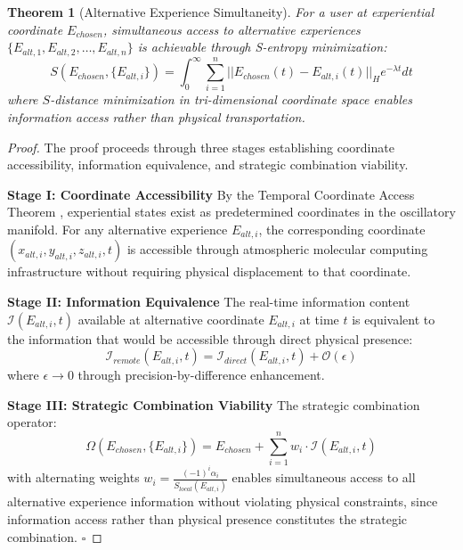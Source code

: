 \documentclass[12pt,a4paper]{article}
\newtheorem{theorem}{Theorem}
\begin{document}
\begin{theorem}[Alternative Experience Simultaneity]
For a user at experiential coordinate $E_{chosen}$, simultaneous access to alternative experiences $\{E_{alt,1}, E_{alt,2}, \ldots, E_{alt,n}\}$ is achievable through S-entropy minimization:
\begin{equation}
S(E_{chosen}, \{E_{alt,i}\}) = \int_0^{\infty} \sum_{i=1}^n ||E_{chosen}(t) - E_{alt,i}(t)||_H e^{-\lambda t} dt
\end{equation}
where $S$-distance minimization in tri-dimensional coordinate space enables information access rather than physical transportation.
\end{theorem}

\begin{proof}
The proof proceeds through three stages establishing coordinate accessibility, information equivalence, and strategic combination viability.

\textbf{Stage I: Coordinate Accessibility}
By the Temporal Coordinate Access Theorem \cite{sachikonye2024temporal}, experiential states exist as predetermined coordinates in the oscillatory manifold. For any alternative experience $E_{alt,i}$, the corresponding coordinate $(x_{alt,i}, y_{alt,i}, z_{alt,i}, t)$ is accessible through atmospheric molecular computing infrastructure without requiring physical displacement to that coordinate.

\textbf{Stage II: Information Equivalence}
The real-time information content $\mathcal{I}(E_{alt,i}, t)$ available at alternative coordinate $E_{alt,i}$ at time $t$ is equivalent to the information that would be accessible through direct physical presence:
\begin{equation}
\mathcal{I}_{remote}(E_{alt,i}, t) = \mathcal{I}_{direct}(E_{alt,i}, t) + \mathcal{O}(\epsilon)
\end{equation}
where $\epsilon \rightarrow 0$ through precision-by-difference enhancement.

\textbf{Stage III: Strategic Combination Viability}
The strategic combination operator:
\begin{equation}
\Omega(E_{chosen}, \{E_{alt,i}\}) = E_{chosen} + \sum_{i=1}^n w_i \cdot \mathcal{I}(E_{alt,i}, t)
\end{equation}
with alternating weights $w_i = \frac{(-1)^i \alpha_i}{S_{local}(E_{alt,i})}$ enables simultaneous access to all alternative experience information without violating physical constraints, since information access rather than physical presence constitutes the strategic combination. $\square$
\end{proof}
\end{document}
